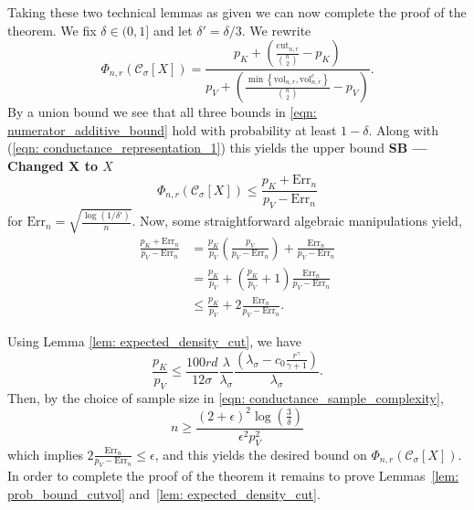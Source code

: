 \documentclass[11pt,twoside]{article}
\newcommand{\set}[1]{\left\{#1\right\}}
\newcommand{\vol}{\mathrm{vol}}
\newcommand{\cut}{\mathrm{cut}}
\newcommand{\1}{\mathbf{1}}
\newcommand{\Err}{\mathrm{Err}}
\newcommand{\Xbf}{X}             %
\newcommand{\Cset}{\mathcal{C}}
\newcommand{\Csig}{\Cset_{\sigma}}
\newcommand{\sbcomment}[1]{{\color{red} \bf{{{{SB --- #1}}}}}}
\begin{document}
Taking these two technical lemmas as given we can now complete the proof of the theorem. 
We fix $\delta \in (0,1]$ and let $\delta' = \delta/3$. We rewrite
\begin{equation}
\label{eqn: conductance_representation_1}
\Phi_{n,r}(\Csig[\Xbf]) = \frac{p_K + \left(\frac{\cut_{n,r}}{{n \choose 2}} - p_K\right)}{p_V + \left(\frac{\min\set{\vol_{n,r}, \vol_{n,r}^c}}{{n \choose 2}} - p_V\right)}.
\end{equation}
By a union bound we see that all three bounds in \eqref{eqn: numerator_additive_bound} hold with probability at least $1 - \delta$. Along with (\ref{eqn: conductance_representation_1}) this yields the upper bound \sbcomment{Changed $\mathbf{X}$ to $X$}
\begin{equation*}
\Phi_{n,r}(\Csig[X]) \leq \frac{p_K + \Err_n}{p_V - \Err_n}
\end{equation*}
for $\Err_n = \sqrt{\frac{\log(1/\delta')}{n}}$.
Now, some straightforward algebraic manipulations yield,
\begin{align*}
\frac{p_K + \Err_n}{p_V - \Err_n} & = \frac{p_K}{p_V} \left(\frac{p_V}{p_V - \Err_n}\right) + \frac{\Err_n}{p_V - \Err_n} \\
& = \frac{p_K}{p_V} + \left(\frac{p_K}{p_V} + 1\right)\frac{\Err_n}{p_V - \Err_n} \\
& \leq \frac{p_K}{p_V} + 2 \frac{\Err_n}{p_V - \Err_n}.
\end{align*}


\noindent Using Lemma \ref{lem: expected_density_cut}, we have
\begin{equation*}
\frac{p_K}{p_V} \leq \frac{100rd}{12\sigma} \frac{\lambda}{\lambda_{\sigma}} \frac{\left(\lambda_{\sigma} - c_0\frac{r^{\gamma}}{\gamma + 1}\right)}{\lambda_{\sigma}}.
\end{equation*}
Then, by the choice of sample size in \eqref{eqn: conductance_sample_complexity}, 
\begin{equation*}
n \geq \frac{(2 + \epsilon)^2 \log\left(\frac{3}{\delta}\right)}{\epsilon^2 p_V^2}
\end{equation*}
which implies $2 \frac{\Err_n}{p_V - \Err_n} \leq \epsilon$, and this yields the desired bound on $\Phi_{n,r}(\Csig[X])$. In order to complete the proof of
the theorem it remains to prove Lemmas~\ref{lem: prob_bound_cutvol} and~\ref{lem: expected_density_cut}.
\end{document}
